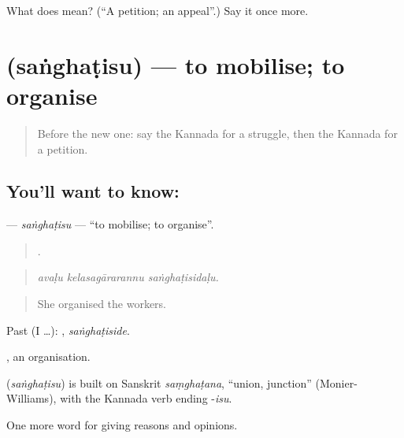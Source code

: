 \begin{tcolorbox}[breakable,colback=teal!4,colframe=teal!35!black,title={Before you move on}]
What does  mean? (\textquotedblleft{}A petition; an appeal\textquotedblright{}.) Say it once more.
\end{tcolorbox}
\section[\texorpdfstring{\kn{ಸಂಘಟಿಸು} (saṅghaṭisu)}{ಸಂಘಟಿಸು (saṅghaṭisu)}]{ (saṅghaṭisu) — to mobilise; to organise}

\label{lesson:KA-C398-sanghatisu}



\begin{quote}
Before the new one: say the Kannada for a struggle, then the Kannada for a petition.
\end{quote}

\subsection*{You'll want to know: }
\textbf{} — \emph{saṅghaṭisu} — \textquotedblleft{}to mobilise; to organise\textquotedblright{}.

\begin{quote}
  .
\end{quote}

\begin{quote}
\emph{avaḷu kelasagārarannu saṅghaṭisidaḷu.}
\end{quote}

\begin{quote}
She organised the workers.
\end{quote}

Past (I …): , \emph{saṅghaṭiside}.

, an organisation.

\begin{cousinweb}
\textbf{} (\emph{saṅghaṭisu}) is built on Sanskrit \emph{saṃghaṭana}, \textquotedblleft{}union, junction\textquotedblright{} (Monier-Williams), with the Kannada verb ending -\emph{isu}.
\end{cousinweb}

\begin{grammarlens}[title={What you've built}]
One more word for giving reasons and opinions.
\end{grammarlens}

